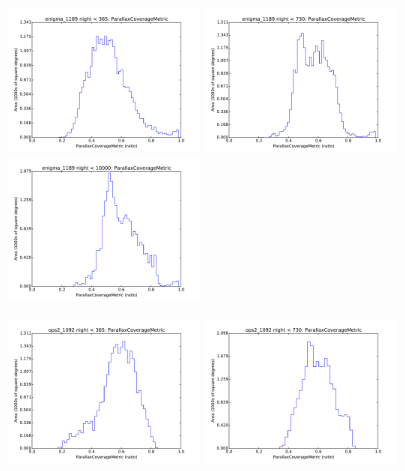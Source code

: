 \begin{figure}[ht]
  \begin{center}
  \includegraphics[width=2.0in]{./figs/milkyway/MW_Astrom_paCovge_1189_01y_hst.pdf}
  \includegraphics[width=2.0in]{./figs/milkyway/MW_Astrom_paCovge_1189_02y_hst.pdf}
  \includegraphics[width=2.0in]{./figs/milkyway/MW_Astrom_paCovge_1189_10y_hst.pdf}
  \end{center}
  \begin{center}
  \includegraphics[width=2.0in]{./figs/milkyway/MW_Astrom_paCovge_1092_01y_hst.pdf}
  \includegraphics[width=2.0in]{./figs/milkyway/MW_Astrom_paCovge_1092_02y_hst.pdf}

\end{center}
\end{figure}
